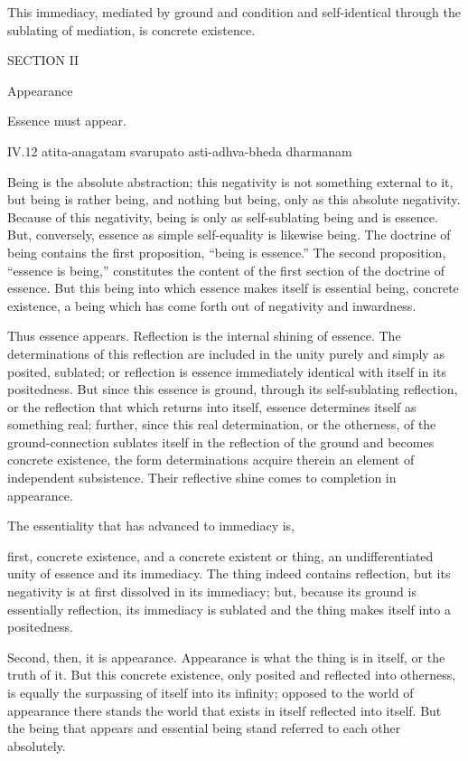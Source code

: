 This immediacy, mediated by ground and condition
and self-identical through the sublating of mediation,
is concrete existence.

SECTION II

Appearance

Essence must appear.

IV.12
atita-anagatam svarupato asti-adhva-bheda dharmanam

Being is the absolute abstraction;
this negativity is not something external to it,
but being is rather being,
and nothing but being,
only as this absolute negativity.
Because of this negativity,
being is only as self-sublating being
and is essence.
But, conversely,
essence as simple self-equality
is likewise being.
The doctrine of being contains
the first proposition, “being is essence.”
The second proposition, “essence is being,”
constitutes the content of the first section
of the doctrine of essence.
But this being into which
essence makes itself
is essential being,
concrete existence,
a being which has come forth
out of negativity and inwardness.

Thus essence appears.
Reflection is the internal shining of essence.
The determinations of this reflection are included
in the unity purely and simply as posited, sublated;
or reflection is essence immediately
identical with itself in its positedness.
But since this essence is ground,
through its self-sublating reflection,
or the reflection that which returns into itself,
essence determines itself as something real;
further, since this real determination, or the otherness,
of the ground-connection sublates itself
in the reflection of the ground
and becomes concrete existence,
the form determinations acquire therein
an element of independent subsistence.
Their reflective shine comes to completion in appearance.

The essentiality that has advanced to immediacy is,

first, concrete existence,
and a concrete existent or thing,
an undifferentiated unity of
essence and its immediacy.
The thing indeed contains reflection,
but its negativity is at first
dissolved in its immediacy;
but, because its ground is
essentially reflection,
its immediacy is sublated
and the thing makes itself
into a positedness.

Second, then, it is appearance.
Appearance is what the thing is in itself,
or the truth of it.
But this concrete existence,
only posited and reflected into otherness,
is equally the surpassing of itself into its infinity;
opposed to the world of appearance
there stands the world that exists
in itself reflected into itself.
But the being that appears and essential being
stand referred to each other absolutely.

